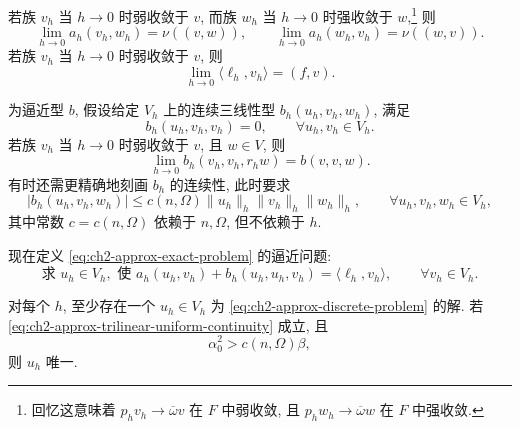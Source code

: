 若族 $v_h$ 当 $h\to0$ 时弱收敛于 $v$, 而族 $w_h$ 当 $h\to0$ 时强收敛于 $w$,\footnote{回忆这意味着 $p_hv_h\to\overline\omega v$ 在 $F$ 中弱收敛, 且 $p_hw_h\to\overline\omega w$ 在 $F$ 中强收敛.} 则
\begin{equation}
\lim_{h\to0}a_h(v_h,w_h)=\nu((v,w)),
\qquad
\lim_{h\to0}a_h(w_h,v_h)=\nu((w,v)).
\label{eq:ch2-approx-bilinear-consistency}
\end{equation}
若族 $v_h$ 当 $h\to0$ 时弱收敛于 $v$, 则
\begin{equation}
\lim_{h\to0}\langle\ell_h,v_h\rangle=(f,v).
\label{eq:ch2-approx-load-consistency}
\end{equation}

\hypertarget{chapter-02-page-150}{}
为逼近型 $b$, 假设给定 $V_h$ 上的连续三线性型 $b_h(u_h,v_h,w_h)$, 满足
\begin{equation}
b_h(u_h,v_h,v_h)=0,
\qquad\forall u_h,v_h\in V_h.
\label{eq:ch2-approx-discrete-trilinear-zero}
\end{equation}
若族 $v_h$ 当 $h\to0$ 时弱收敛于 $v$, 且 $w\in V$, 则
\begin{equation}
\lim_{h\to0}b_h(v_h,v_h,r_hw)=b(v,v,w).
\label{eq:ch2-approx-trilinear-consistency}
\end{equation}
有时还需更精确地刻画 $b_h$ 的连续性, 此时要求
\begin{equation}
|b_h(u_h,v_h,w_h)|
\leq c(n,\Omega)\lVert u_h\rVert_h\lVert v_h\rVert_h\lVert w_h\rVert_h,
\qquad\forall u_h,v_h,w_h\in V_h,
\label{eq:ch2-approx-trilinear-uniform-continuity}
\end{equation}
其中常数 $c=c(n,\Omega)$ 依赖于 $n,\Omega$, 但不依赖于 $h$.

现在定义 \eqref{eq:ch2-approx-exact-problem} 的逼近问题:
\begin{equation}
\text{求 }u_h\in V_h,\text{ 使 }
a_h(u_h,v_h)+b_h(u_h,u_h,v_h)=\langle\ell_h,v_h\rangle,
\qquad\forall v_h\in V_h.
\label{eq:ch2-approx-discrete-problem}
\end{equation}

\begin{Proposition}
\label{prop:ch2-approx-discrete-existence-uniqueness}
对每个 $h$, 至少存在一个 $u_h\in V_h$ 为 \eqref{eq:ch2-approx-discrete-problem} 的解. 若 \eqref{eq:ch2-approx-trilinear-uniform-continuity} 成立, 且
\begin{equation}
\alpha_0^2>c(n,\Omega)\beta,
\label{eq:ch2-approx-discrete-uniqueness-condition}
\end{equation}
则 $u_h$ 唯一.
\end{Proposition}

